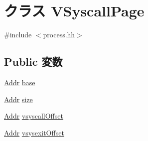 \hypertarget{classX86ISA_1_1I386LiveProcess_1_1VSyscallPage}{
\section{クラス VSyscallPage}
\label{classX86ISA_1_1I386LiveProcess_1_1VSyscallPage}
}


{\ttfamily \#include $<$process.hh$>$}\subsection*{Public 変数}
\begin{DoxyCompactItemize}
\item 
\hyperlink{base_2types_8hh_af1bb03d6a4ee096394a6749f0a169232}{Addr} \hyperlink{classX86ISA_1_1I386LiveProcess_1_1VSyscallPage_acbb25a86d519ae439e2d01ddb0b85357}{base}
\item 
\hyperlink{base_2types_8hh_af1bb03d6a4ee096394a6749f0a169232}{Addr} \hyperlink{classX86ISA_1_1I386LiveProcess_1_1VSyscallPage_a8ce507144b5ef53350af753eafb669f0}{size}
\item 
\hyperlink{base_2types_8hh_af1bb03d6a4ee096394a6749f0a169232}{Addr} \hyperlink{classX86ISA_1_1I386LiveProcess_1_1VSyscallPage_a25e9c58aee3d0c9703241fa6050e180f}{vsyscallOffset}
\item 
\hyperlink{base_2types_8hh_af1bb03d6a4ee096394a6749f0a169232}{Addr} \hyperlink{classX86ISA_1_1I386LiveProcess_1_1VSyscallPage_a1e6ef77838358497dc782b098f3f027b}{vsysexitOffset}
\end{DoxyCompactItemize}


